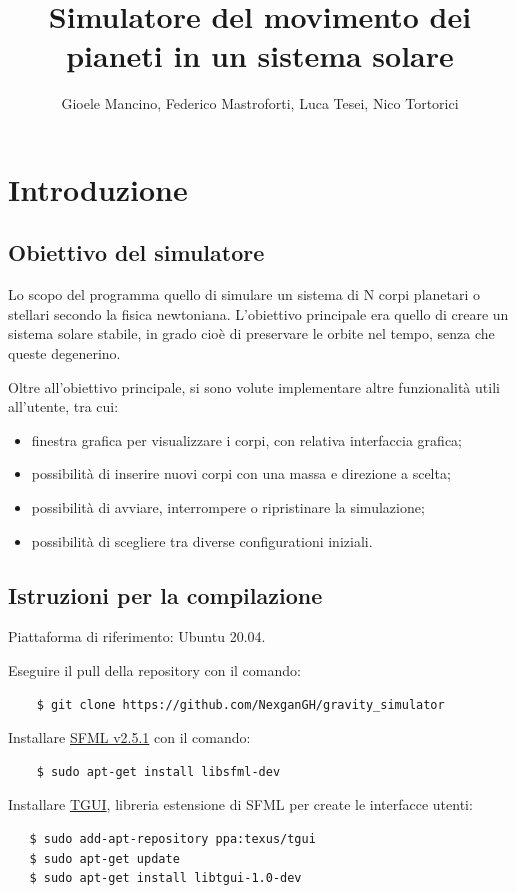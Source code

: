 \documentclass{article}
\title{Simulatore del movimento dei pianeti in un sistema solare}
\author{Gioele Mancino, Federico Mastroforti, Luca Tesei, Nico Tortorici}
\begin{document}
\maketitle
\section{Introduzione}

\subsection{Obiettivo del simulatore}
Lo scopo del programma quello di simulare un sistema di N corpi planetari o stellari secondo la fisica newtoniana. L'obiettivo principale era quello di creare un sistema solare stabile, in grado cioè di preservare le orbite nel tempo, senza che queste degenerino.

Oltre all'obiettivo principale, si sono volute implementare altre funzionalità utili all'utente, tra cui:
\begin{itemize}
    \item finestra grafica per visualizzare i corpi, con relativa interfaccia grafica;
    \item possibilità di inserire nuovi corpi con una massa e direzione a scelta;
    \item possibilità di avviare, interrompere o ripristinare la simulazione;
    \item possibilità di scegliere tra diverse configurationi iniziali.
\end{itemize}

\subsection{Istruzioni per la compilazione}

Piattaforma di riferimento: Ubuntu 20.04.

Eseguire il pull della repository con il comando:
\begin{verbatim}
    $ git clone https://github.com/NexganGH/gravity_simulator
\end{verbatim}

Installare \href{https://www.sfml-dev.org/tutorials/2.5/start-linux.php}{SFML v2.5.1} con il comando:
\begin{verbatim}
    $ sudo apt-get install libsfml-dev
\end{verbatim}

Installare \href{https://www.sfml-dev.org/tutorials/2.5/start-linux.php}{TGUI}, libreria estensione di SFML per create le interfacce utenti:
\begin{verbatim}
   $ sudo add-apt-repository ppa:texus/tgui
   $ sudo apt-get update
   $ sudo apt-get install libtgui-1.0-dev
    \end{verbatim}
\end{document}
